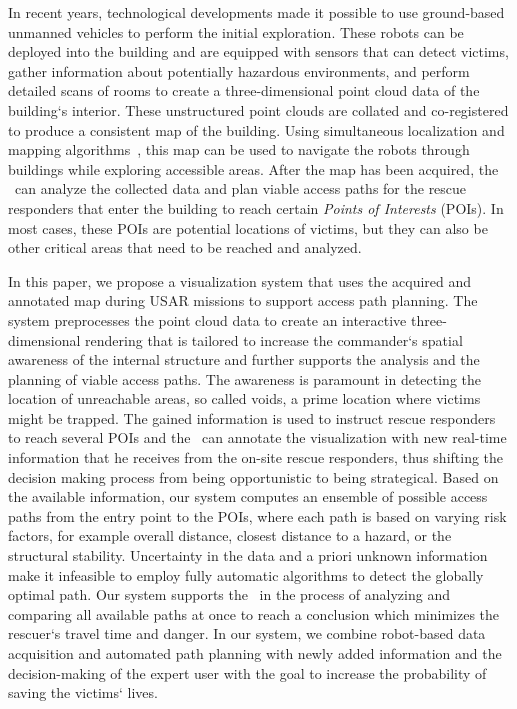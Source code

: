 In recent years, technological developments made it possible to use ground-based unmanned vehicles to perform the initial exploration. These robots can be deployed into the building and are equipped with sensors that can detect victims, gather information about potentially hazardous environments, and perform detailed scans of rooms to create a three-dimensional point cloud data of the building`s interior. These unstructured point clouds are collated and co-registered to produce a consistent map of the building. Using simultaneous localization and mapping algorithms~\cite{Dissanayake01asolution, Ziparo459917}, this map can be used to navigate the robots through buildings while exploring accessible areas. After the map has been acquired, the \IC\ can analyze the collected data and plan viable access paths for the rescue responders that enter the building to reach certain \emph{Points of Interests} (POIs). In most cases, these POIs are potential locations of victims, but they can also be other critical areas that need to be reached and analyzed.

In this paper, we propose a visualization system that uses the acquired and annotated map during USAR missions to support access path planning. The system preprocesses the point cloud data to create an interactive three-dimensional rendering that is tailored to increase the commander`s spatial awareness of the internal structure and further supports the analysis and the planning of viable access paths. The awareness is paramount in detecting the location of unreachable areas, so called voids, a prime location where victims might be trapped. The gained information is used to instruct rescue responders to reach several POIs and the \IC\ can annotate the visualization with new real-time information that he receives from the on-site rescue responders, thus shifting the decision making process from being opportunistic to being strategical. Based on the available information, our system computes an ensemble of possible access paths from the entry point to the POIs, where each path is based on varying risk factors, for example overall distance, closest distance to a hazard, or the structural stability. Uncertainty in the data and a priori unknown information make it infeasible to employ fully automatic algorithms to detect the globally optimal path. Our system supports the \IC\ in the process of analyzing and comparing all available paths at once to reach a conclusion which minimizes the rescuer`s travel time and danger. In our system, we combine robot-based data acquisition and automated path planning with newly added information and the decision-making of the expert user with the goal to increase the probability of saving the victims` lives.

